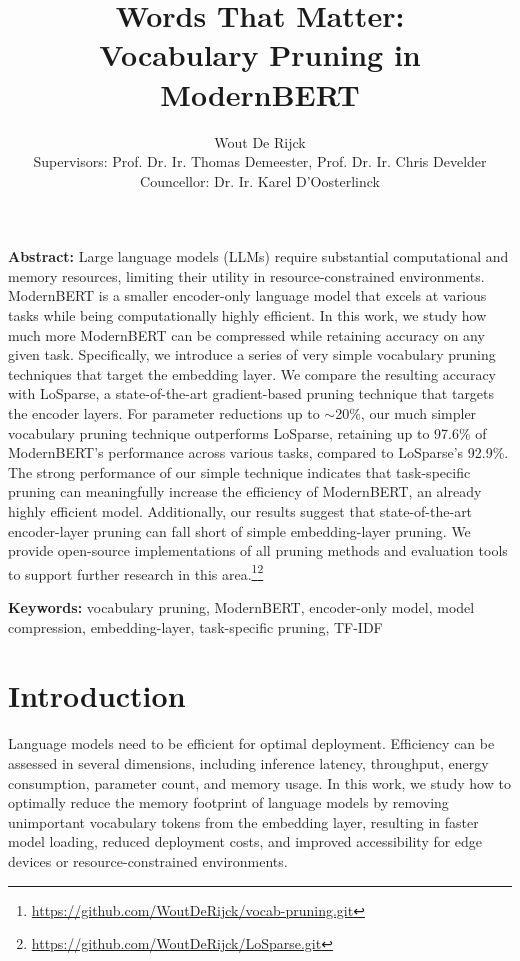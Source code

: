 \documentclass[twocolumn]{article}
\title{\vspace{-1.5cm}\huge Words That Matter:\\ Vocabulary Pruning in ModernBERT}
\author{
Wout De Rijck\\[0.5em]
\small{Supervisors:} \normalsize Prof. Dr. Ir. Thomas Demeester, \normalsize Prof. Dr. Ir. Chris Develder\\
\small{Councellor:} \normalsize Dr. Ir. Karel D'Oosterlinck
}
\date{} %
\begin{document}
\maketitle


\textbf{Abstract:} Large language models (LLMs) require substantial computational and memory resources, limiting their utility in resource-constrained environments. 
ModernBERT is a smaller encoder-only language model that excels at various tasks while being computationally highly efficient. 
In this work, we study how much more ModernBERT can be compressed while retaining accuracy on any given task.
Specifically, we introduce a series of very simple vocabulary pruning techniques that target the embedding layer. We compare the resulting accuracy with LoSparse, a state-of-the-art gradient-based pruning technique that targets the encoder layers.
For parameter reductions up to $\sim$20\%, our much simpler vocabulary pruning technique outperforms LoSparse, retaining up to 97.6\% of ModernBERT's performance across various tasks, compared to LoSparse's 92.9\%.
The strong performance of our simple technique indicates that task-specific pruning can meaningfully increase the efficiency of ModernBERT, an already highly efficient model. Additionally, our results suggest that state-of-the-art encoder-layer pruning can fall short of simple embedding-layer pruning.
We provide open-source implementations of all pruning methods and evaluation tools to support further research in this area.\footnote{\url{https://github.com/WoutDeRijck/vocab-pruning.git}}\footnote{\url{https://github.com/WoutDeRijck/LoSparse.git}}

\textbf{Keywords:} vocabulary pruning, ModernBERT, encoder-only model, model compression, embedding-layer, task-specific pruning, TF-IDF

\section{Introduction}
Language models need to be efficient for optimal deployment.
Efficiency can be assessed in several dimensions, including inference latency, throughput, energy consumption, parameter count, and memory usage.
In this work, we study how to optimally reduce the memory footprint of language models by removing unimportant vocabulary tokens from the embedding layer, resulting in faster model loading, reduced deployment costs, and improved accessibility for edge devices or resource-constrained environments.
\end{document}
